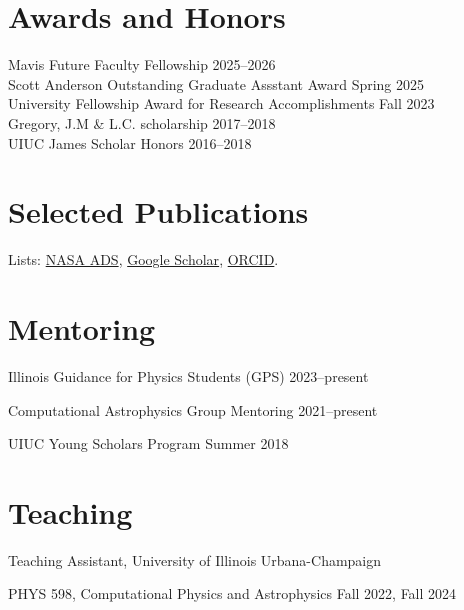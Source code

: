 \documentclass[11pt]{article}
\begin{document}
\else\fi

\section*{Awards and Honors}
Mavis Future Faculty Fellowship \hfill 2025--2026\\
Scott Anderson Outstanding Graduate Assstant Award \hfill Spring 2025\\
University Fellowship Award for Research Accomplishments \hfill Fall 2023\\
Gregory, J.M \& L.C. scholarship \hfill 2017--2018\\
UIUC James Scholar Honors \hfill 2016--2018

\section*{Selected Publications}
Lists: \href{\adslibrary}{NASA ADS}, \href{\googlescholar}{Google Scholar}, \href{https://orcid.org/0000-0002-2514-5965}{ORCID}.


\begin{etaremune}[leftmargin=1.25em]

\end{etaremune}


\section*{Mentoring}
Illinois Guidance for Physics Students (GPS) \hfill 2023--present\\

Computational Astrophysics Group Mentoring \hfill 2021--present\\

UIUC Young Scholars Program \hfill Summer 2018\\

\section*{Teaching}
Teaching Assistant, University of Illinois Urbana-Champaign

PHYS 598, Computational Physics and Astrophysics \hfill Fall 2022, Fall 2024
\end{document}

